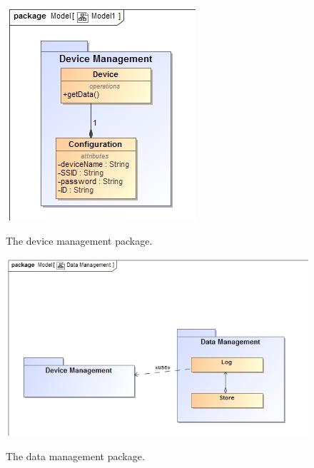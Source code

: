 \documentclass[paper=a4, fontsize=11pt]{scrartcl} %
\begin{document}
	\begin{figure}[H]
		\includegraphics[width=\textwidth]{images/DeviceManagement.jpg}  \\
		\caption{The device management package.}
	\end{figure}
	
	\begin{figure}[H]
		\includegraphics[width=\textwidth]{images/DataManagement.jpg}  \\
		\caption{The data management package.}
	\end{figure}
	
\end{document}
